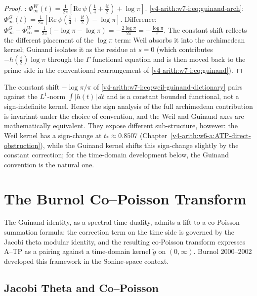\begin{proof}
: \(\Phi_{\infty}^{W}(t)=
\tfrac{1}{2\pi}[\mathrm{Re}\,\psi(\tfrac14+\tfrac{it}{2})+\log\pi]\).
\eqref{v4-arith:w7-i:eq:guinand-arch}: \(\Phi_{\infty}^{G}(t)=
\tfrac{1}{2\pi}[\mathrm{Re}\,\psi(\tfrac14+\tfrac{it}{2})-\log\pi]\).
Difference: \(\Phi_{\infty}^{G}-\Phi_{\infty}^{W}
=\tfrac{1}{2\pi}(-\log\pi-\log\pi)=-\tfrac{2\log\pi}{2\pi}=-\tfrac{\log\pi}{\pi}\).
The constant shift reflects the different placement of the \(\log\pi\)
term: Weil absorbs it into the archimedean kernel; Guinand isolates it
as the residue at \(s=0\) (which contributes \(-h(\tfrac{i}{2})\log\pi\)
through the \(\Gamma\) functional equation and is then moved back to
the prime side in the conventional rearrangement of
\eqref{v4-arith:w7-i:eq:guinand}).
\end{proof}

\begin{remark}
\label{v4-arith:w7-i:rem:constant-shift}
The constant shift \(-\log\pi/\pi\) of
\eqref{v4-arith:w7-i:eq:weil-guinand-dictionary} pairs against the
\(L^{1}\)-norm \(\int|h(t)|\,dt\) and is a constant bounded functional,
not a sign-indefinite kernel. Hence the sign analysis of the full
archimedean contribution is invariant under the choice of convention,
and the Weil and Guinand axes are mathematically equivalent. They
expose different sub-structure, however: the Weil kernel has a sign-change at \(t_{\ast}\approx 0.8507\)
(Chapter~\ref{v4-arith:w6-a:ATP-direct-obstruction}), while the Guinand
kernel shifts this sign-change slightly by the constant correction;
for the time-domain development below, the Guinand convention is
the natural one.
\end{remark}

\section{The Burnol Co--Poisson Transform}
\label{v4-arith:w7-i:burnol-copoisson}

The Guinand identity, as a spectral-time duality, admits a lift to
a co-Poisson summation formula: the correction term on the time side
is governed by the Jacobi theta modular identity, and the resulting
co-Poisson transform expresses A--TP as a pairing against a
time-domain kernel \(\widetilde g\) on \((0,\infty)\). Burnol
2000--2002 developed this framework in the Sonine-space context.

\subsection{Jacobi Theta and Co--Poisson}
\label{v4-arith:w7-i:burnol:theta}

